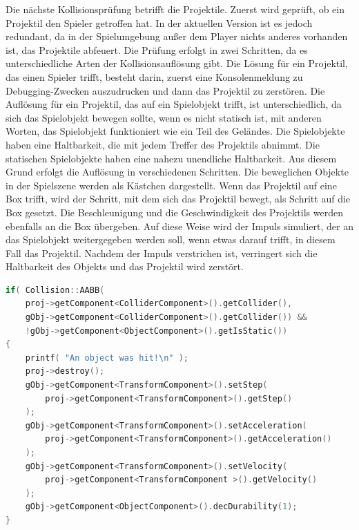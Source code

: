 \documentclass[
  10pt,
  a4paper,
  oneside,
  headers,
  headinclude,
  footinclude,
  BCOR5mm,
]{article}
\begin{document}
Die nächste Kollisionsprüfung betrifft die Projektile. Zuerst wird geprüft, ob
ein Projektil den Spieler getroffen hat. In der aktuellen Version ist es jedoch
redundant, da in der Spielumgebung außer dem Player nichts anderes vorhanden
ist, das Projektile abfeuert. Die Prüfung erfolgt in zwei Schritten, da es
unterschiedliche Arten der Kollisionsauflösung gibt. Die Lösung für ein
Projektil, das einen Spieler trifft, besteht darin, zuerst eine Konsolenmeldung
zu Debugging-Zwecken auszudrucken und dann das Projektil zu zerstören. Die
Auflösung für ein Projektil, das auf ein Spielobjekt trifft, ist
unterschiedlich, da sich das Spielobjekt bewegen sollte, wenn es nicht statisch
ist, mit anderen Worten, das Spielobjekt funktioniert wie ein Teil des Geländes.
Die Spielobjekte haben eine Haltbarkeit, die mit jedem Treffer des Projektils
abnimmt. Die statischen Spielobjekte haben eine nahezu unendliche Haltbarkeit.
Aus diesem Grund erfolgt die Auflösung in verschiedenen Schritten. Die
beweglichen Objekte in der Spielszene werden als Kästchen dargestellt. Wenn das
Projektil auf eine Box trifft, wird der Schritt, mit dem sich das Projektil
bewegt, als Schritt auf die Box gesetzt. Die Beschleunigung und die
Geschwindigkeit des Projektils werden ebenfalls an die Box übergeben. Auf diese
Weise wird der Impuls simuliert, der an das Spielobjekt weitergegeben werden
soll, wenn etwas darauf trifft, in diesem Fall das Projektil. Nachdem der Impuls
verstrichen ist, verringert sich die Haltbarkeit des Objekts und das Projektil
wird zerstört.

\begin{lstlisting}[language=C++]
if( Collision::AABB(
    proj->getComponent<ColliderComponent>().getCollider(),
    gObj->getComponent<ColliderComponent>().getCollider()) &&
    !gObj->getComponent<ObjectComponent>().getIsStatic())
{
    printf( "An object was hit!\n" );
    proj->destroy();
    gObj->getComponent<TransformComponent>().setStep(
        proj->getComponent<TransformComponent>().getStep()
    );
    gObj->getComponent<TransformComponent>().setAcceleration(
        proj->getComponent<TransformComponent>().getAcceleration()
    );
    gObj->getComponent<TransformComponent>().setVelocity(
        proj->getComponent<TransformComponent >().getVelocity()
    );
    gObj->getComponent<ObjectComponent>().decDurability(1);
}
\end{lstlisting}
\end{document}
